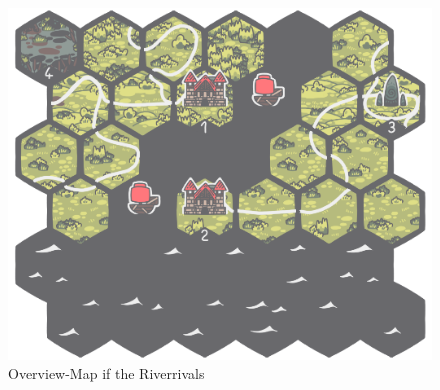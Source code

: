 \documentclass[a5paper,pagesize,10pt,bibtotoc,pointlessnumbers,
normalheadings,DIV=9,twoside=false]{scrbook}
\begin{document}
\begin{figure}[t]
\includegraphics[scale=0.5]{RiverClash}
\centering
\caption{Overview-Map if the Riverrivals}
\end{figure}
\end{document}
